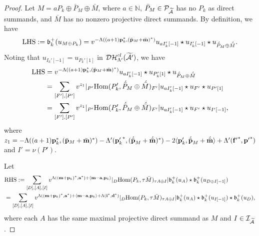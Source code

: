 \documentclass[reqno,12pt]{amsart}
\numberwithin{equation}{section}
\def\lr#1{\langle #1\rangle} \def\fin{\hfill$\square$}  \def\lra{\longrightarrow} \def\mod{\mbox{\rm \textbf{mod}}\,}\def\Mod{\mbox{\rm mod}\,}\def\top{\mbox{\rm top}\,}\def\soc{\mbox{\rm soc}\,}
\theoremstyle{plain} %
\theoremstyle{definition} %
\begin{document}
\begin{proof}
Let $M=aP_k\oplus \bar{P}_M\oplus \bar{M}$, where $a\in\mathbb{N}$, $\bar{P}_M\in \mathcal{P}_{\widetilde{\mathcal{A}}}$ has no $P_k$ as direct summands, and $\bar{M}$ has no nonzero projective direct summands. By definition, we have
\begin{align*}
{\rm LHS}:=\mathfrak{b}_k^+(u_{M\oplus P_k})=v^{-\Lambda((a+1)\mathbf{p}_k^\ast,(\bar{\bf p}_M+\bar{\bf m})^\ast)}u_{aI_k'[-1]}\star u_{I_k'[-1]}\star u_{\acute{\bar{P}}_M\oplus \acute{\bar{M}}}.
\end{align*}
Noting that $u_{I_k'[-1]}=u_{P_k'[1]}$ in $\mathcal{DH}_{\Lambda'}^{cl}(\widetilde{\mathcal{A}'})$, we have
\begin{align*}
{\rm LHS}&=v^{-\Lambda((a+1)\mathbf{p}_k^\ast,(\bar{\bf p}_M+\bar{\bf m})^\ast)}u_{aI_k'[-1]}\star u_{P_k'[1]}\star u_{\acute{\bar{P}}_M\oplus \acute{\bar{M}}}\\
&=\sum\limits_{[F'],[P']}v^{z_1}|_{P'}\mbox{\rm Hom}(P'_k,\acute{\bar{P}}_M\oplus \acute{\bar{M}})_{F'}|u_{aI_k'[-1]}\star u_{F'}\star u_{P'[1]}\\
&=\sum\limits_{[F'],[P']}v^{z_1}|_{P'}\mbox{\rm Hom}(P'_k,\acute{\bar{P}}_M\oplus \acute{\bar{M}})_{F'}|u_{aI_k'[-1]}\star u_{F'}\star u_{I'[-1]},
\end{align*}
where $z_1=-\Lambda((a+1)\mathbf{p}_k^\ast,(\bar{\bf p}_M+\bar{\bf m})^\ast)-\Lambda'({{\bf p}_k'}^\ast,({\acute{\bar{\bf p}}}_M+{\acute{\bar{\bf m}}})^\ast)-2\lr{{{\bf p}_k'},{\acute{\bar{\bf p}}}_M+{\acute{\bar{\bf m}}}}+\Lambda'({{\bf f}'}^\ast,{{\bf p}'}^\ast)$ and $I'=\nu(P')$.

Let
\begin{align*}
&{\rm RHS}:=\sum_{[D],[A],[I]}v^{\Lambda(({\bf m}+{\bf p}_k)^\ast, {\bf a}^\ast)+\lr{{\bf m}-{\bf a},{\bf p}_k}}|_D\Hom(P_k,\tau \bar{M})_{\tau A\oplus I}|\mathfrak{b}_k^+(u_A)\star \mathfrak{b}_k^+(u_{D\oplus I[-1]})\\
&=\sum_{[D],[A],[I]}v^{\Lambda(({\bf m}+{\bf p}_k)^\ast, {\bf a}^\ast)+\lr{{\bf m}-{\bf a},{\bf p}_k}+\Lambda({\bf i}^\ast,{\bf d}^\ast)}|_D\Hom(P_k,\tau \bar{M})_{\tau A\oplus I}|\mathfrak{b}_k^+(u_A)\star \mathfrak{b}_k^+(u_{I[-1]})\star \mathfrak{b}_k^+(u_{D}),
\end{align*}
where each $A$ has the same maximal projective direct summand as $M$ and $I\in\mathcal{I}_{\widetilde{\mathcal{A}}}$.


\end{proof}
\end{document}
